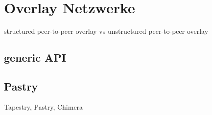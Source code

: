
\section{Overlay Netzwerke}
structured peer-to-peer overlay vs unstructured peer-to-peer overlay

\subsection{generic API}
\cite{citeulike:6643572} %

\subsection{Pastry}
\cite{citeulike:780210} %
Tapestry, Pastry, Chimera
